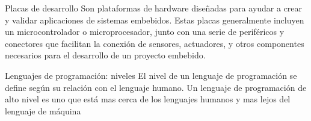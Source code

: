 \documentclass[aspectratio=169]{beamer}
\begin{document}
\begin{frame}[t]{Placas de desarrollo}
Son plataformas de hardware diseñadas para ayudar a crear y validar aplicaciones de sistemas embebidos. Estas placas generalmente incluyen un microcontrolador o microprocesador, junto con una serie de periféricos y conectores que facilitan la conexión de sensores, actuadores, y otros componentes necesarios para el desarrollo de un proyecto embebido.

\end{frame}



\begin{frame}[t]{Lenguajes de programación: niveles}
El nivel de un lenguaje de programación se define según su relación con el lenguaje humano. Un lenguaje de programación de alto nivel es uno que está mas cerca de los lenguajes humanos y mas lejos del lenguaje de máquina

\end{frame}
\end{document}
